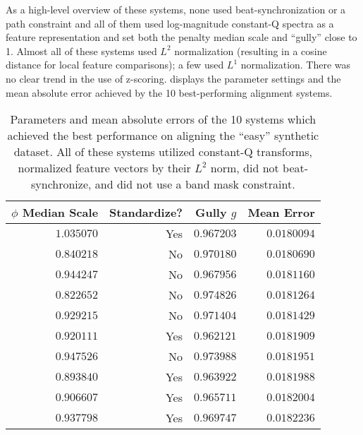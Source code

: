 As a high-level overview of these systems, none used beat-synchronization or a path constraint and all of them used log-magnitude constant-Q spectra as a feature representation and set both the penalty median scale and ``gully'' close to 1.
Almost all of these systems used $L^2$ normalization (resulting in a cosine distance for local feature comparisons); a few used $L^1$ normalization.
There was no clear trend in the use of z-scoring.
 displays the parameter settings and the mean absolute error achieved by the 10 best-performing alignment systems.

\begin{table}
\centering
        \begin{tabular}{rrrr}
        \toprule
        $\phi$ Median Scale  & Standardize?   &   Gully $g$ &   Mean Error \\
        \midrule
                  $1.035070$ & Yes            &    $0.967203$ &    $0.0180094$ \\
                  $0.840218$ & No             &    $0.970180$ &    $0.0180690$ \\
                  $0.944247$ & No             &    $0.967956$ &    $0.0181160$ \\
                  $0.822652$ & No             &    $0.974826$ &    $0.0181264$ \\
                  $0.929215$ & No             &    $0.971404$ &    $0.0181429$ \\
                  $0.920111$ & Yes            &    $0.962121$ &    $0.0181909$ \\
                  $0.947526$ & No             &    $0.973988$ &    $0.0181951$ \\
                  $0.893840$ & Yes            &    $0.963922$ &    $0.0181988$ \\
                  $0.906607$ & Yes            &    $0.965711$ &    $0.0182004$ \\
                  $0.937798$ & Yes            &    $0.969747$ &    $0.0182236$ \\
        \bottomrule
        \end{tabular}
  \caption[Parameters and mean absolute errors of the 10 best-performing systems]{Parameters and mean absolute errors of the 10 systems which achieved the best performance on aligning the ``easy'' synthetic dataset.
All of these systems utilized constant-Q transforms, normalized feature vectors by their $L^2$ norm, did not beat-synchronize, and did not use a band mask constraint.}
  \label{tab:best_systems}
\end{table}


